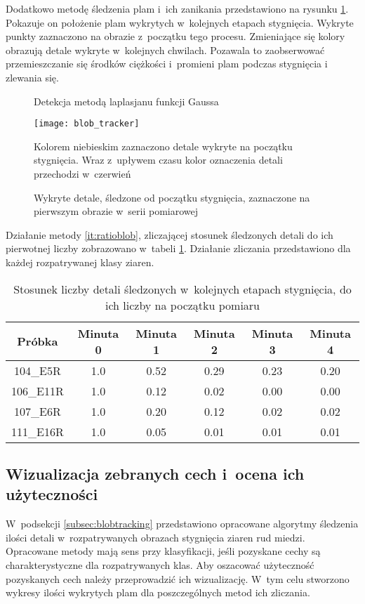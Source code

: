 Dodatkowo metodę śledzenia plam i~ich zanikania przedstawiono na rysunku
\ref{fig:blobremain}.
Pokazuje on położenie plam wykrytych w~kolejnych etapach stygnięcia.
Wykryte punkty zaznaczono na obrazie z~początku tego procesu.
Zmieniające się kolory obrazują detale wykryte w~kolejnych chwilach.
Pozawala to zaobserwować przemieszczanie się środków ciężkości i~promieni
plam podczas stygnięcia i zlewania się.
\begin{figure}[htb]
    \centering
    \caption*{\scriptsize Detekcja metodą laplasjanu funkcji Gaussa}
    \texttt{[image: blob\_tracker]}
    \vspace{0.3cm}
    \caption*{\scriptsize
        Kolorem niebieskim zaznaczono detale wykryte na początku stygnięcia.
        Wraz z~upływem czasu kolor oznaczenia detali przechodzi w~czerwień}
    \caption{Wykryte detale, śledzone od początku stygnięcia, zaznaczone na
             pierwszym obrazie w~serii pomiarowej}
    \label{fig:blobremain}
\end{figure}
Działanie metody \ref{it:ratioblob}, zliczającej stosunek śledzonych detali 
do ich pierwotnej liczby zobrazowano w~tabeli \ref{tab:blobratio}.
Działanie zliczania przedstawiono dla każdej rozpatrywanej klasy ziaren.
\begin{table}[htb]
	\centering
	\begin{tabular}{c|c|c|c|c|c}
	\toprule
	Próbka & Minuta 0 & Minuta 1 & Minuta 2 & Minuta 3 & Minuta 4 \\ \midrule
	104\_E5R  & 1.0 & 0.52 & 0.29 & 0.23 & 0.20 \\
	106\_E11R & 1.0 & 0.12 & 0.02 & 0.00 & 0.00 \\
	107\_E6R  & 1.0 & 0.20 & 0.12 & 0.02 & 0.02 \\
	111\_E16R & 1.0 & 0.05 & 0.01 & 0.01 & 0.01 \\
	\bottomrule
	\end{tabular}
\caption{Stosunek liczby detali śledzonych w~kolejnych etapach stygnięcia, do
         ich liczby na początku pomiaru}
\label{tab:blobratio}
\end{table}

\subsection{Wizualizacja zebranych cech i~ocena ich użyteczności}
\label{subsec:datavis}
W~podsekcji \ref{subsec:blobtracking} przedstawiono opracowane algorytmy
śledzenia ilości detali w~rozpatrywanych obrazach stygnięcia ziaren rud
miedzi.
Opracowane metody mają sens przy klasyfikacji, jeśli pozyskane cechy są
charakterystyczne dla rozpatrywanych klas.
Aby oszacować użyteczność pozyskanych cech należy przeprowadzić ich
wizualizację.
W~tym celu stworzono wykresy ilości wykrytych plam dla poszczególnych
metod ich zliczania.

